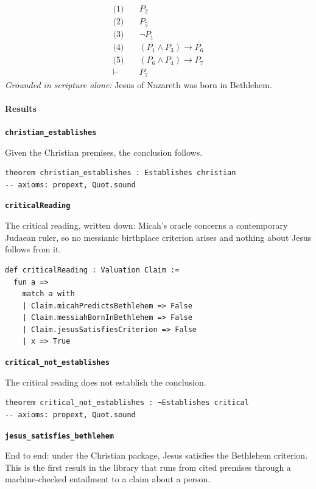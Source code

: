 \documentclass[11pt]{article}
\begin{document}
\begin{align*}
  \text{(1)} \quad & P_{2} \\
  \text{(2)} \quad & P_{5} \\
  \text{(3)} \quad & \lnot P_{1} \\
  \text{(4)} \quad & (P_{1} \land P_{3}) \rightarrow P_{6} \\
  \text{(5)} \quad & (P_{6} \land P_{4}) \rightarrow P_{7} \\
  \vdash \quad & P_{7}
\end{align*}
\emph{Grounded in scripture alone:} Jesus of Nazareth was born in Bethlehem.
\paragraph*{Results}
\leavevmode\par
\par\medskip\noindent\textbf{\texttt{christian\_\allowbreak{}establishes}}\par\nobreak\noindent
Given the Christian premises, the conclusion follows.

{\small\begin{verbatim}
theorem christian_establishes : Establishes christian
-- axioms: propext, Quot.sound
\end{verbatim}}
\par\medskip\noindent\textbf{\texttt{critical\allowbreak{}Reading}}\par\nobreak\noindent
The critical reading, written down: Micah's oracle concerns a contemporary Judaean ruler, so no messianic birthplace criterion arises and nothing about Jesus follows from it.

{\small\begin{verbatim}
def criticalReading : Valuation Claim :=
  fun a =>
    match a with
    | Claim.micahPredictsBethlehem => False
    | Claim.messiahBornInBethlehem => False
    | Claim.jesusSatisfiesCriterion => False
    | x => True
\end{verbatim}}
\par\medskip\noindent\textbf{\texttt{critical\_\allowbreak{}not\_\allowbreak{}establishes}}\par\nobreak\noindent
The critical reading does not establish the conclusion.

{\small\begin{verbatim}
theorem critical_not_establishes : ¬Establishes critical
-- axioms: propext, Quot.sound
\end{verbatim}}
\par\medskip\noindent\textbf{\texttt{jesus\_\allowbreak{}satisfies\_\allowbreak{}bethlehem}}\par\nobreak\noindent
End to end: under the Christian package, Jesus satisfies the Bethlehem criterion. This is the first result in the library that runs from cited premises through a machine-checked entailment to a claim about a person.
\end{document}
